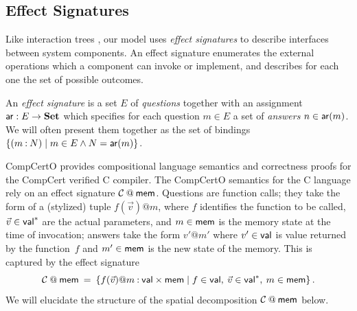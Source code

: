 \subsection{Effect Signatures} \label{sec:esig} %

Like interaction trees \cite{itrees},
our model uses \emph{effect signatures}
to describe interfaces between system components.
An effect signature enumerates
the external operations which
a component can invoke or implement,
and describes for each one
the set of possible outcomes.

\begin{definition} \label{def:esig}
An \emph{effect signature} is a set $E$ of \emph{questions}
together with an assignment $ \mathsf{ar}  : E \rightarrow \mathbf{Set}$
which specifies for each question $m \in E$
a set of \emph{answers} $n \in  \mathsf{ar} (m)$.
We will often present them together as the set of bindings
$\{ (m \mathbin: N) \mid m \in E \wedge N =  \mathsf{ar} (m) \}$.
\end{definition}


\begin{example} \label{ex:compcertosig} %

CompCertO \cite{compcerto} provides
compositional language semantics and correctness proofs
for the CompCert verified C compiler.
The CompCertO semantics for the C language
rely on an effect signature $\mathcal{C} \mathbin@ \kw{mem}$.
Questions are function calls;
they take the form of a (stylized) tuple $f(\vec{v})@m$, where
$f$ identifies the function to be called,
$\vec{v} \in  \mathsf{val} ^*$ are the actual parameters, and
$m \in  \mathsf{mem} $ is the memory state at the time of invocation;
answers take the form $v'@m'$ where
$v' \in  \mathsf{val} $ is value returned by the function~$f$ and
$m' \in  \mathsf{mem} $ is the new state of the memory.
This is captured by the effect signature
\[
  \mathcal{C} \mathbin@ \kw{mem} \:=\:
  \{ f(\vec{v})@m \mathbin: \kw{val} \times \kw{mem} \mid
     f \in \kw{val}, \:
     \vec{v} \in \kw{val}^*, \:
     m \in \kw{mem} \}
  \,.
\]
We will elucidate the structure of
the spatial decomposition $\mathcal{C} \mathbin@ \kw{mem}$ below.
\end{example}

